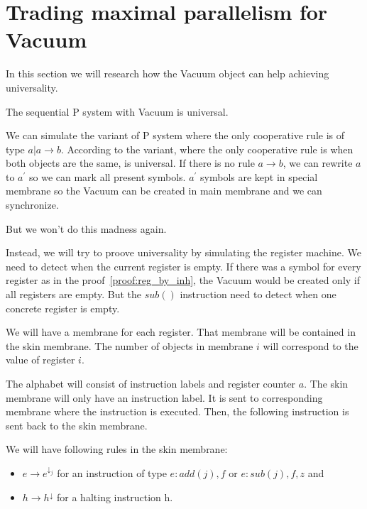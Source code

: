 \documentclass[a4paper,10pt]{article}
\begin{document}

\section{Trading maximal parallelism for Vacuum}

In this section we will research how the Vacuum object can help achieving universality.

\begin{veta}
  The sequential P system with Vacuum is universal.
\end{veta}

\begin{dokaz}
  We can simulate the variant of P system where the only cooperative rule is of type $a|a \rightarrow b$. According to \cite{Ibarra04dang:the} the variant, where the only cooperative rule is when both objects are the same, is universal. If there is no rule $a \rightarrow b$, we can rewrite $a$ to $a^{\prime}$ so we can mark all present symbols. $a^{\prime}$ symbols are kept in special membrane so the Vacuum can be created in main membrane and we can synchronize.
  
  But we won't do this madness again.
  
  Instead, we will try to proove universality by simulating the register machine. We need to detect when the current register is empty. If there was a symbol for every register as in the proof~\ref{proof:reg_by_inh}, the Vacuum would be created only if all registers are empty. But the $sub()$ instruction need to detect when one concrete register is empty.
  
  We will have a membrane for each register. That membrane will be contained in the skin membrane. The number of objects in membrane $i$ will correspond to the value of register $i$.
  
  The alphabet will consist of instruction labels and register counter $a$. The skin membrane will only have an instruction label. It is sent to corresponding membrane where the instruction is executed. Then, the following instruction is sent back to the skin membrane.
  
  We will have following rules in the skin membrane:
  
  \begin{itemize}
	\item $e \rightarrow e^{\downarrow_j}$ for an instruction of type $e : add(j), f$ or $e : sub(j), f, z$ and
	\item $h \rightarrow h^{\downarrow}$ for a halting instruction h.
  \end{itemize}
  

\end{dokaz}
\end{document}

